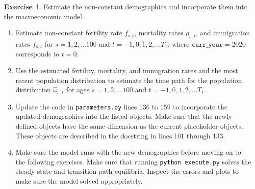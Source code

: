 \documentclass[letterpaper,12pt]{article}
\theoremstyle{definition}
\newtheorem{exercise}[theorem]{Exercise}
\begin{document}
  \begin{exercise}\label{ExDemog}
    Estimate the non-constant demographics and incorporate them into the macroeconomic model.
    \begin{enumerate}
      \item Estimate non-constant fertility rate $f_{s,t}$, mortality rates $\rho_{s,t}$, and immigration rates $f_{s,t}$ for $s=1,2,...100$ and $t=-1,0,1,2,...T_1$, where $\texttt{curr\_year}=2020$ corresponds to $t=0$.
      \item Use the estimated fertility, mortality, and immigration rates and the most recent population distribution to estimate the time path for the population distribution $\hat{\omega}_{s,t}$ for ages $s=1,2,...100$ and $t=-1,0,1,2,...T_1$.
      \item Update the code in \texttt{parameters.py} lines 136 to 159 to incorporate the updated demographics into the listed objects. Make sure that the newly defined objects have the same dimension as the current placeholder objects. These objects are described in the docstring in lines 101 through 133.
      \item Make sure the model runs with the new demographics before moving on to the following exercises. Make sure that running \texttt{python execute.py} solves the steady-state and transition path equilibria. Inspect the errors and plots to make sure the model solved appropriately.
    \end{enumerate}
  \end{exercise}
\end{document}
